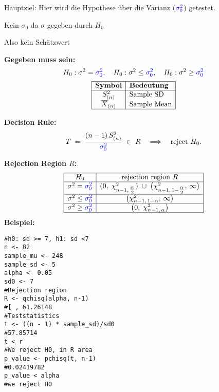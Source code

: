 \begin{center}
\end{center}
\normalsize

Hauptziel: Hier wird die Hypothese über die Varianz ($\textcolor{blue}{\sigma_0^2}$) getestet.
\begin{center}

\textcolor{red}{\warning} Kein $\sigma_0$ da $\sigma$ gegeben durch $H_0$\textcolor{red}{\warning}

\textcolor{red}{\warning} Also kein Schätzwert \textcolor{red}{\warning}
\end{center}
\large{\textbf{Gegeben muss sein:}}
\[
H_0: \sigma^2 = \textcolor{blue}{\sigma_0^2}, \quad H_0: \sigma^2 \leq \textcolor{blue}{\sigma_0^2}, \quad H_0: \sigma^2 \geq \textcolor{blue}{\sigma_0^2}
\]
\[
\begin{array}{|c|l|}
\hline
\textbf{Symbol} & \textbf{Bedeutung} \\
\hline
S_{(n)}^2& \text{Sample SD} \\
\overline{X}_{(n)} & \text{Sample Mean} \\
\hline
\end{array}
\]
\begin{comment}
\large{\textbf{Teststatistic:}}
\[
T \;=\; \frac{(n-1)\,S_{(n)}^2}{\textcolor{blue}{\sigma^2}}
\;\;\sim\;\;\chi^2_{n-1}
\quad\text{with}\quad
S_{(n)}^2
\;=\;
\frac{1}{n-1}\sum_{i=1}^n
\bigl(X_i - \overline{X}_{(n)}\bigr)^2.
\]
\end{comment}

\large{\textbf{Decision Rule:}}
\[
T
\;=\;
\frac{(n-1)\,S_{(n)}^2}{\textcolor{blue}{\sigma_0^2}}
\;\in\; R
\quad\Longrightarrow\quad
\text{reject }H_0.
\]

\large{\textbf{Rejection Region \(R\):}}
\[
\begin{array}{|c|c|}
\hline
H_0 & \text{rejection region } R \\
\hline
\sigma^2 = \textcolor{blue}{\sigma_0^2}
&
(0,\;\chi^2_{n-1,\,\tfrac{\alpha}{2}})
\;\cup\;
\bigl(\chi^2_{n-1,\,1-\tfrac{\alpha}{2}},\,\infty\bigr)
\\ \hline
\sigma^2 \leq \textcolor{blue}{\sigma_0^2}
&
\bigl(\chi^2_{n-1,\,1-\alpha},\,\infty\bigr)
\\ \hline
\sigma^2 \geq \textcolor{blue}{\sigma_0^2}
&
\bigl(0,\;\chi^2_{n-1,\,\alpha}\bigr)
\\ \hline
\end{array}
\]
\large{\textbf{Beispiel:}}
\begin{lstlisting}
#h0: sd >= 7, h1: sd <7
n <- 82
sample_mu <- 248
sample_sd <- 5
alpha <- 0.05
sd0 <- 7
#Rejection region 
R <- qchisq(alpha, n-1)
#[ , 61.26148
#Teststatistics
t <- ((n - 1) * sample_sd)/sd0
#57.85714
t < r
#We reject H0, in R area
p_value <- pchisq(t, n-1)
#0.02419782
p_value < alpha
#we reject H0
\end{lstlisting}
\columnbreak
\begin{center}
\end{center}
\normalsize

